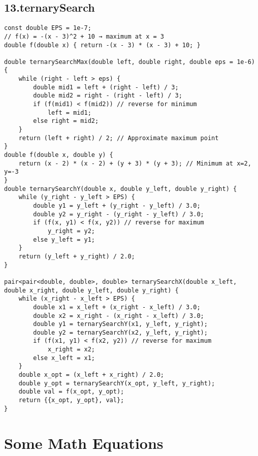 \documentclass[twoside]{article}
\begin{document}
\begin{multicols*}{2}
{\subsection*{13.ternarySearch}
}
\begin{verbatim}
const double EPS = 1e-7;
// f(x) = -(x - 3)^2 + 10 → maximum at x = 3
double f(double x) { return -(x - 3) * (x - 3) + 10; }

double ternarySearchMax(double left, double right, double eps = 1e-6) {
    while (right - left > eps) {
        double mid1 = left + (right - left) / 3;
        double mid2 = right - (right - left) / 3;
        if (f(mid1) < f(mid2)) // reverse for minimum
            left = mid1;
        else right = mid2;
    }
    return (left + right) / 2; // Approximate maximum point
}
double f(double x, double y) {
    return (x - 2) * (x - 2) + (y + 3) * (y + 3); // Minimum at x=2, y=-3
}
double ternarySearchY(double x, double y_left, double y_right) {
    while (y_right - y_left > EPS) {
        double y1 = y_left + (y_right - y_left) / 3.0;
        double y2 = y_right - (y_right - y_left) / 3.0;
        if (f(x, y1) < f(x, y2)) // reverse for maximum
            y_right = y2;
        else y_left = y1;
    }
    return (y_left + y_right) / 2.0;
}

pair<pair<double, double>, double> ternarySearchX(double x_left, double x_right, double y_left, double y_right) {
    while (x_right - x_left > EPS) {
        double x1 = x_left + (x_right - x_left) / 3.0;
        double x2 = x_right - (x_right - x_left) / 3.0;
        double y1 = ternarySearchY(x1, y_left, y_right);
        double y2 = ternarySearchY(x2, y_left, y_right);
        if (f(x1, y1) < f(x2, y2)) // reverse for maximum
            x_right = x2;
        else x_left = x1;
    }
    double x_opt = (x_left + x_right) / 2.0;
    double y_opt = ternarySearchY(x_opt, y_left, y_right);
    double val = f(x_opt, y_opt);
    return {{x_opt, y_opt}, val};
}
\end{verbatim}


{
\section*{Some Math Equations}
}
{
}
\end{multicols*}
\end{document}
